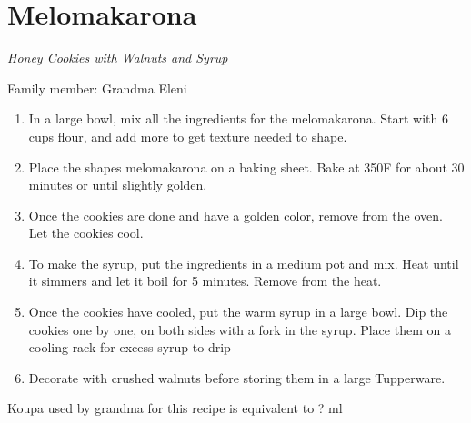 \chapter{Melomakarona}
\label{ch:melomakarona}


\textit{Honey Cookies with Walnuts and Syrup}

Family member: Grandma Eleni

\begin{enumerate}
    \item In a large bowl, mix all the ingredients for the melomakarona. Start with 6 cups flour, and add more to get texture needed to shape.
    \item Place the shapes melomakarona on a baking sheet. Bake at 350\degree F for about 30 minutes or until slightly golden.
    \item Once the cookies are done and have a golden color, remove from the oven. Let the cookies cool. 
    \item To make the syrup, put the ingredients in a medium pot and mix. Heat until it simmers and let it boil for 5 minutes. Remove from the heat.
    \item Once the cookies have cooled, put the warm syrup in a large bowl. Dip the cookies one by one, on both sides with a fork in the syrup. Place them on a cooling rack for excess syrup to drip
    \item Decorate with crushed walnuts before storing them in a large Tupperware.
\end{enumerate}

Koupa used by grandma for this recipe is equivalent to ? ml
